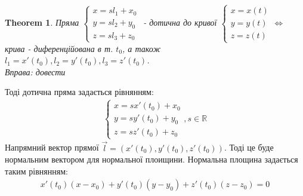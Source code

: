 \documentclass[a4paper, 10pt]{article}
\theoremstyle{theoremdd}
\newtheorem{theorem}{Theorem}[subsection]
\theoremstyle{theoremdd}
\theoremstyle{theoremdd}
\theoremstyle{theoremdd}
\theoremstyle{theoremdd}
\theoremstyle{theoremdd}
\theoremstyle{theoremdd}
\theoremstyle{theoremdd}
\begin{document}
\begin{theorem}
Пряма $\begin{cases} x = sl_1 + x_0 \\ y = sl_2 + y_0 \\ z = sl_3 + z_0 \end{cases}$ - дотична до кривої $\begin{cases} x = x(t) \\ y = y(t) \\ z = z(t) \end{cases} \iff$ крива - диференційована в т. $t_0$, а також $l_1 = x'(t_0), l_2 = y'(t_0), l_3 = z'(t_0)$.\\
\textit{Вправа: довести}
\end{theorem}
Тоді дотична пряма задається рівнянням:
\begin{align*}
\begin{cases}
x=s x'(t_0)+x_0 \\
y=s y'(t_0)+y_0\\
z=s z'(t_0)+z_0
\end{cases}, s \in \mathbb{R}
\end{align*}
Напрямний вектор прямої $\vec{l} = (x'(t_0),y'(t_0),z'(t_0))$. Тоді це буде нормальним вектором для нормальної плоищини. Нормальна площина задається таким рівнянням:
\begin{align*}
x'(t_0)(x-x_0) + y'(t_0)(y-y_0) + z'(t_0)(z-z_0) = 0
\end{align*}
\end{document}
